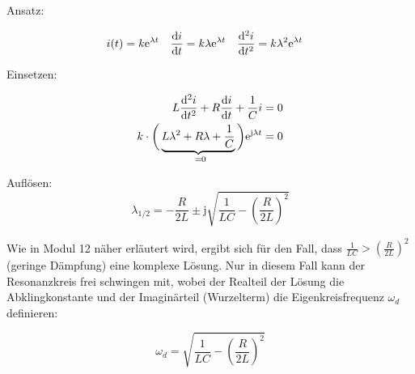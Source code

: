 \begin{frame}
{    Ansatz:

    \begin{align*}
        i(t) 
            &= k \mathrm{e}^{\lambda t}&%
        \frac{\d i}{\d t}
            &= k\lambda \mathrm{e}^{\lambda t}&%
        \frac{\d^2 i}{\d t^2}
            &= k\lambda^2 \mathrm{e}^{\lambda t}
    \end{align*}
    
    Einsetzen:

    \begin{align*}
        L \frac{\d^2i}{\d t^2} + R \frac{\mathrm{d}i}{\d t} + \frac{1}{C} i &= 0 \\
        k \cdot \bigg( \underbrace{L \lambda^2 + R \lambda + \frac{1}{C}}_{=\mathclap{\ 0}} \bigg) \mathrm{e}^{\mathrm{j} \lambda t} &= 0
    \end{align*}

    Auflösen:
    \begin{equation*}
        \lambda_{1/2} = -\frac{R}{2L} \pm \mathrm{j} \sqrt{\frac{1}{LC} - \left(\frac{R}{2L}\right)^2}
    \end{equation*}

    Wie in Modul 12 näher erläutert wird, ergibt sich für den Fall, dass $\frac{1}{LC} > \left(\frac{R}{2L}\right)^2$ (geringe Dämpfung) 
    eine komplexe Lösung. Nur in diesem Fall kann der Resonanzkreis frei schwingen mit, wobei
    der Realteil der Lösung die Abklingkonstante und der Imaginärteil (Wurzelterm) die Eigenkreisfrequenz $\omega_d$ definieren:

    \begin{equation*}
        \omega_{d} = \sqrt{\frac{1}{LC} - \left(\frac{R}{2L}\right)^2}
    \end{equation*}
}
\end{frame}


